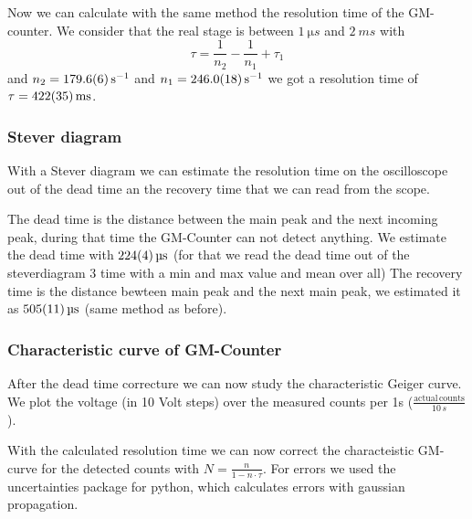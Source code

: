 Now we can calculate with the same method the resolution time of the GM-counter.
We consider that the real stage is between $\SI{1}{\micro s}$ and $\SI{2}{ms}$ with
\begin{equation}
\tau =\frac{1}{n_2}-\frac{1}{n_1}+\tau_1
\end{equation}
and $n_2=\SI{179.6\pm0.6}{s^{-1}}$ and $n_1=\SI{246.0\pm1.8}{s^{-1}}$ we got a resolution time of $\tau=\SI{422\pm35}{ms}$.

\subsubsection{Stever diagram}


With a Stever diagram we can estimate the resolution time on the oscilloscope out of the dead time an the recovery time that we can read from the scope. 

The dead time is the distance between the main peak and the next incoming peak, during that time the GM-Counter can not detect anything.
We estimate the dead time with $\SI{224 \pm 4}{\micro s}$ (for that we read the dead time out of the steverdiagram 3 time with a min and max value and mean over all)
The recovery time is the distance bewteen main peak and the next main peak, we estimated it as $\SI{505\pm11}{\micro s}$ (same method as before).

\subsubsection{Characteristic curve of GM-Counter}
After the dead time correcture we can now study the characteristic Geiger curve.
We plot the voltage (in 10 Volt steps) over the measured counts per 1s ($\frac{\mathrm{actual\,counts}}{10\,s}$).

With the calculated resolution time we can now correct the characteistic GM-curve for the detected counts with $N =\frac{n}{1-n\cdot\tau}$. 
For errors we used the uncertainties package for python, which calculates errors with gaussian propagation.


